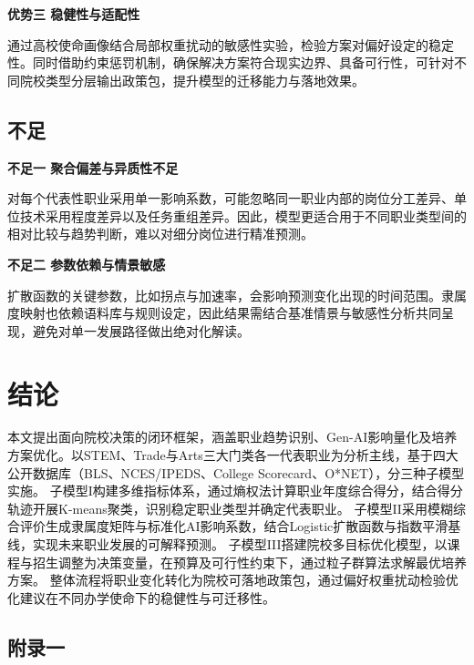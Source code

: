\documentclass{mcmthesis}
\begin{document}
\medskip

\noindent\textbf{优势三 稳健性与适配性}

通过高校使命画像结合局部权重扰动的敏感性实验，检验方案对偏好设定的稳定性。同时借助约束惩罚机制，确保解决方案符合现实边界、具备可行性，可针对不同院校类型分层输出政策包，提升模型的迁移能力与落地效果。

\subsection{不足}

\noindent\textbf{不足一 聚合偏差与异质性不足}

对每个代表性职业采用单一影响系数，可能忽略同一职业内部的岗位分工差异、单位技术采用程度差异以及任务重组差异。因此，模型更适合用于不同职业类型间的相对比较与趋势判断，难以对细分岗位进行精准预测。

\medskip

\noindent\textbf{不足二 参数依赖与情景敏感}

扩散函数的关键参数，比如拐点与加速率，会影响预测变化出现的时间范围。隶属度映射也依赖语料库与规则设定，因此结果需结合基准情景与敏感性分析共同呈现，避免对单一发展路径做出绝对化解读。








\section{结论}
本文提出面向院校决策的闭环框架，涵盖职业趋势识别、Gen-AI影响量化及培养方案优化。以STEM、Trade与Arts三大门类各一代表职业为分析主线，基于四大公开数据库（BLS、NCES/IPEDS、College Scorecard、O*NET），分三种子模型实施。
子模型I构建多维指标体系，通过熵权法计算职业年度综合得分，结合得分轨迹开展K-means聚类，识别稳定职业类型并确定代表职业。
子模型II采用模糊综合评价生成隶属度矩阵与标准化AI影响系数，结合Logistic扩散函数与指数平滑基线，实现未来职业发展的可解释预测。
子模型III搭建院校多目标优化模型，以课程与招生调整为决策变量，在预算及可行性约束下，通过粒子群算法求解最优培养方案。
整体流程将职业变化转化为院校可落地政策包，通过偏好权重扰动检验优化建议在不同办学使命下的稳健性与可迁移性。



\begin{appendices}
\section{附录一}




\end{appendices}
\end{document}
